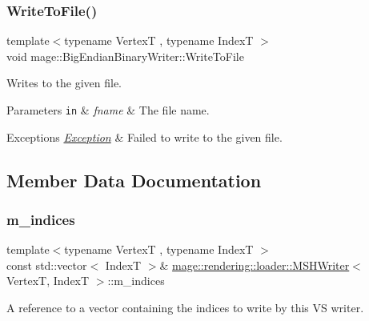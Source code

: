 \subsubsection{\texorpdfstring{Write\+To\+File()}{WriteToFile()}}
{\footnotesize\ttfamily template$<$typename VertexT , typename IndexT $>$ \\
void mage\+::\+Big\+Endian\+Binary\+Writer\+::\+Write\+To\+File}

Writes to the given file.


\begin{DoxyParams}[1]{Parameters}
\mbox{\tt in}  & {\em fname} & The file name. \\
\hline
\end{DoxyParams}

\begin{DoxyExceptions}{Exceptions}
{\em \mbox{\hyperlink{classmage_1_1_exception}{Exception}}} & Failed to write to the given file. \\
\hline
\end{DoxyExceptions}


\subsection{Member Data Documentation}
\mbox{\label{classmage_1_1rendering_1_1loader_1_1_m_s_h_writer_a7de7ca864e3a3a384bf7c98997146748}} 
\subsubsection{\texorpdfstring{m\+\_\+indices}{m\_indices}}
{\footnotesize\ttfamily template$<$typename VertexT , typename IndexT $>$ \\
const std\+::vector$<$ IndexT $>$\& \mbox{\hyperlink{classmage_1_1rendering_1_1loader_1_1_m_s_h_writer}{mage\+::rendering\+::loader\+::\+M\+S\+H\+Writer}}$<$ VertexT, IndexT $>$\+::m\+\_\+indices\hspace{0.3cm}{\ttfamily [private]}}

A reference to a vector containing the indices to write by this VS writer. \mbox{\label{classmage_1_1rendering_1_1loader_1_1_m_s_h_writer_adf2b47491fdda0077ba3bf1053f343d0}} 

